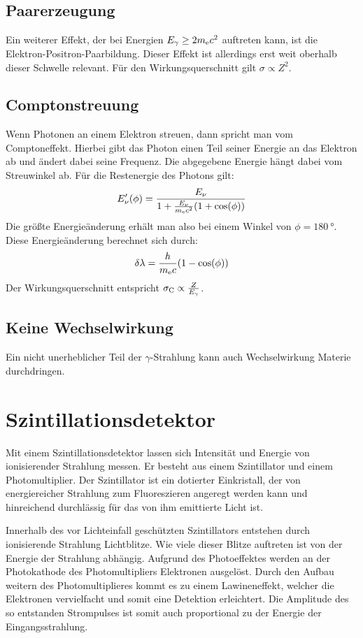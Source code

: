 \documentclass[11pt, ngerman, fleqn, DIV=15, headinclude, BCOR=2cm]{scrreprt}
\begin{document}
\subsection{Paarerzeugung}

Ein weiterer Effekt, der bei Energien $E_\gamma \ge 2m_\text ec^2$ auftreten
kann, ist die Elektron-Positron-Paarbildung.
Dieser Effekt ist allerdings erst weit oberhalb dieser Schwelle relevant.
Für den Wirkungsquerschnitt gilt $\sigma \propto Z^2$.

\subsection{Comptonstreuung}

Wenn Photonen an einem Elektron streuen, dann spricht man vom Comptoneffekt. 
Hierbei gibt das Photon einen Teil seiner Energie an das Elektron ab und ändert dabei
seine Frequenz.
Die abgegebene Energie hängt dabei vom Streuwinkel ab.
Für die Restenergie des Photons gilt:
\[
    E_\nu'(\phi) = \frac{E_\nu}{1+\frac{E_\nu}{m_\text ec^2}(1+\cos(\phi))}
\]
Die größte Energieänderung erhält man also bei einem Winkel von
$\phi=\SI{180}{\degree}$.
Diese Energieänderung berechnet sich durch:
\[
    \delta\lambda = \frac{h}{m_\text ec}(1-\cos(\phi))
\]
Der Wirkungsquerschnitt entspricht $\sigma_\text C \propto \frac{Z}{E_\gamma}$.

\subsection{Keine Wechselwirkung}

Ein nicht unerheblicher Teil der $\gamma$-Strahlung kann auch Wechselwirkung
Materie durchdringen.

\section{Szintillationsdetektor}

Mit einem Szintillationsdetektor lassen sich Intensität und Energie von
ionisierender Strahlung messen.
Er besteht aus einem Szintillator und einem Photomultiplier.
Der Szintillator ist ein dotierter Einkristall, der von energiereicher
Strahlung zum Fluoreszieren angeregt werden kann und hinreichend
durchlässig für das von ihm emittierte Licht ist.

Innerhalb des vor Lichteinfall geschützten Szintillators entstehen durch
ionisierende Strahlung Lichtblitze. 
Wie viele dieser Blitze auftreten ist von der Energie der Strahlung abhängig.
Aufgrund des Photoeffektes werden an der Photokathode des Photomultipliers
Elektronen ausgelöst.
Durch den Aufbau weitern des Photomultiplieres kommt es zu einem Lawineneffekt,
welcher die Elektronen vervielfacht und somit eine Detektion erleichtert.
Die Amplitude des so entstanden Strompulses ist somit auch proportional zu der
Energie der Eingangsstrahlung.
\end{document}
